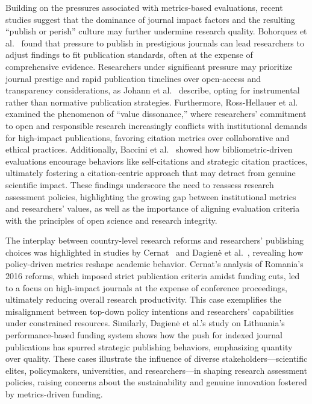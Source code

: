 \documentclass[amsfonts, amssymb, prl, superscriptaddress, notitlepage, twocolumn, nofootinbib]{revtex4-2}
\begin{document}
Building on the pressures associated with metrics-based evaluations, recent studies suggest that the dominance of journal impact factors and the resulting “publish or perish” culture may further undermine research quality. Bohorquez et al.~\cite{bohorquez2024researchers} found that pressure to publish in prestigious journals can lead researchers to adjust findings to fit publication standards, often at the expense of comprehensive evidence. Researchers under significant pressure may prioritize journal prestige and rapid publication timelines over open-access and transparency considerations, as Johann et al.~\cite{johann_impact_2024} describe, opting for instrumental rather than normative publication strategies. Furthermore, Ross-Hellauer et al.~\cite{ross-hellauer_value_2024} examined the phenomenon of “value dissonance,” where researchers’ commitment to open and responsible research increasingly conflicts with institutional demands for high-impact publications, favoring citation metrics over collaborative and ethical practices. Additionally, Baccini et al.~\cite{baccini2019citation} showed how bibliometric-driven evaluations encourage behaviors like self-citations and strategic citation practices, ultimately fostering a citation-centric approach that may detract from genuine scientific impact. These findings underscore the need to reassess research assessment policies, highlighting the growing gap between institutional metrics and researchers’ values, as well as the importance of aligning evaluation criteria with the principles of open science and research integrity.

The interplay between country-level research reforms and researchers’ publishing choices was highlighted in studies by Cernat~\cite{cernat_unprincipled_2024} and Dagienė et al.~\cite{dagiene_incentivising_2024}, revealing how policy-driven metrics reshape academic behavior. Cernat’s analysis of Romania’s 2016 reforms, which imposed strict publication criteria amidst funding cuts, led to a focus on high-impact journals at the expense of conference proceedings, ultimately reducing overall research productivity. This case exemplifies the misalignment between top-down policy intentions and researchers’ capabilities under constrained resources. Similarly, Dagienė et al.’s study on Lithuania’s performance-based funding system shows how the push for indexed journal publications has spurred strategic publishing behaviors, emphasizing quantity over quality. These cases illustrate the influence of diverse stakeholders—scientific elites, policymakers, universities, and researchers—in shaping research assessment policies, raising concerns about the sustainability and genuine innovation fostered by metrics-driven funding.
\end{document}
